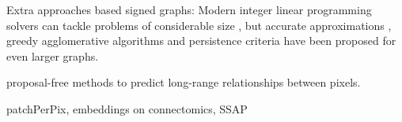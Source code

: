 Extra approaches based signed graphs: Modern integer linear programming solvers can tackle problems of considerable size \cite{andres2012globally}, but accurate approximations \cite{pape2017solving,beier2016efficient,yarkony2012fast}, greedy agglomerative algorithms \cite{levinkov2017comparative,wolf2019mutex,keuper2015efficient,kardoostsolving} and persistence criteria \cite{lange2018partial,lange2018combinatorial} have been proposed for even larger graphs. 


proposal-free methods \cite{liu2018affinity,wolf2018mutex,lee2017superhuman} to predict long-range relationships between pixels.

\TODO{} patchPerPix, embeddings on connectomics, SSAP



